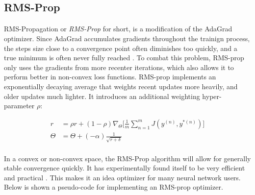 \documentclass[12pt,letterpaper]{article}
\begin{document}
\newpage

\subsection{RMS-Prop}

\paragraph*{}RMS-Propagation or \textit{RMS-Prop} for short, is a modification of the AdaGrad optimizer. Since AdaGrad accumulates gradients throughout the trainign process, the steps size close to a convergence point often diminishes too quickly, and a true minimum is often never fully reached \cite{Geron}. To combat this problem, RMS-prop only uses the gradients from more recenter iterations, which also allows it to perform better in non-convex loss functions. RMS-prop implements an exponentially decaying average that weights recent updates more heavily, and older updates much lighter. It introduces an additional weighting hyper-parameter $\rho$:

\begin{equation}
\label{RMSprop Update}
\begin{split}
r &= \rho r + (1 - \rho) \nabla_{\Theta} \Big[ \frac{1}{m} \sum_{n=1}^{m} J(y^{(n)},y^{*(n)}) \Big] \\
\Theta &= \Theta + (-\alpha) \frac{1}{\sqrt{r + \delta}}
\end{split}
\end{equation}

\paragraph*{}In a convex or non-convex space, the RMS-Prop algorithm will allow for generally stable convergence quickly. It has experimentally found itself to be very efficient and practical \cite{Goodfellow}. This makes it an idea optimizer for many neural network users.  Below is shown a pseudo-code for implementing an RMS-prop optimizer.
\end{document}

